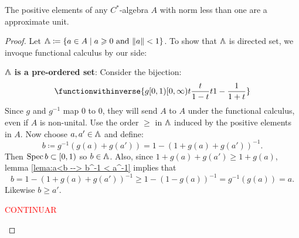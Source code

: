 \begin{teorema}
The positive elements of any $C^*$-algebra $A$ with norm less than one are a approximate unit.
\end{teorema}
\begin{proof}
Let $\LLambda \coloneqq \{a\in A \mid a \geq 0 \text{ and } \|a\| < 1\}$. To show that $\LLambda$ is directed set, we invoque functional calculus by our side:  
\begin{itroman}
\item \textbf{$\boldsymbol{\LLambda}$ is a pre-ordered set}: Consider the bijection:
\begin{equation*}
    \functionwithinverse{g{[0,1)}{[0,\infty)}{t}{\dfrac{t}{1-t}}t{1-\dfrac{1}{1+t}}}
\end{equation*}
Since $g$ and $g^{-1}$ map $0$ to $0$, they will send $A$ to $A$ under the functional calculus, even if $A$ is non-unital. Use the order $\geq$ in $\LLambda$ induced by the positive elements in $A$. Now choose $a, a'\in \LLambda$ and define:
$$b \coloneqq g^{-1}(g(a)+g(a'))=1-(1+g(a)+g(a'))^{-1}.$$
Then $\operatorname{Spec} b \subset [0,1)$ so $b\in \LLambda$. Also, since $1+g(a)+g(a') \geq 1+g(a)$, lemma \ref{lema:a<b --> b^-1 < a^-1} implies that
$$
b=1-(1+g(a)+g(a'))^{-1} \geq 1-(1-g(a))^{-1}=g^{-1}(g(a))=a.
$$
Likewise $b \geq a'$. 
\item \textcolor{red}{CONTINUAR}
\qedhere
\end{itroman}
\end{proof}

